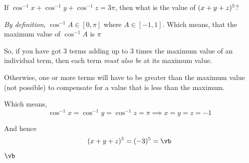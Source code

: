 

\va\vb


\question[4] If $\cos^{-1} x + \cos^{-1} y + \cos^{-1} z = 3\pi$, then what is the value 
of $(x+y+z)^5$?


\ifprintanswers
\fi 

\begin{solution}[\halfpage]
	\textit{By definition}, $\cos^{-1} A \in [0,\pi]$ where $A \in [-1,1]$. Which means, 
	that the maximum value of $\cos^{-1} A$ is $\pi$
	
	So, if you have got 3 terms adding up to 3 times the maximum value of an individual term, 
	then each term \textit{must also be} at its maximum value. 
  
  Otherwise, one or more terms will have to be greater than the maximum value (not possible) 
  to compensate for a value that is less than the maximum.

  Which means, 
  \[ \cos^{-1} x = \cos^{-1}y = \cos^{-1}z = \pi \implies x = y = z = -1 \]

  And hence
    \[ (x+y+z)^\va = (-3)^\va = \vb \]
\end{solution}

\ifprintanswers
  \begin{codex}
    $\vb$
  \end{codex}
\fi
